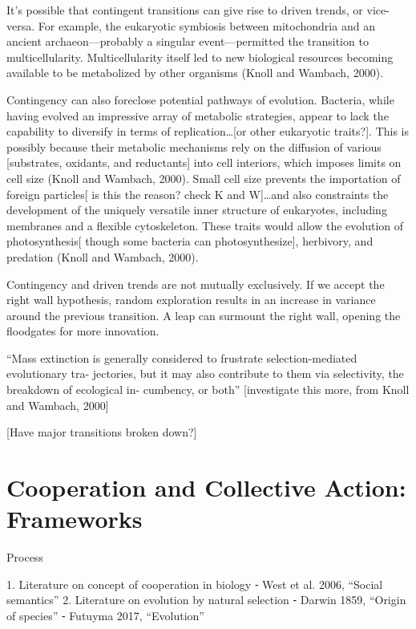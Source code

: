 \documentclass{tufte-book} %
\begin{document}
It’s possible that contingent transitions can give rise to driven trends, or vice-versa. For example, the eukaryotic symbiosis between mitochondria and an ancient archaeon—probably a singular event—permitted the transition to multicellularity. Multicellularity itself led to new biological resources becoming available to be metabolized by other organisms (Knoll and Wambach, 2000). 

Contingency can also foreclose potential pathways of evolution. Bacteria, while having evolved an impressive array of metabolic strategies, appear to lack the capability to diversify in terms of replication…[or other eukaryotic traits?]. This is possibly because their metabolic mechanisms rely on the diffusion of various [substrates, oxidants, and reductants] into cell interiors, which imposes limits on cell size (Knoll and Wambach, 2000). Small cell size prevents the importation of foreign particles[ is this the reason? check K and W]…and also constraints the development of the uniquely versatile inner structure of eukaryotes, including membranes and a flexible cytoskeleton. These traits would allow the evolution of photosynthesis[ though some bacteria can photosynthesize], herbivory, and predation (Knoll and Wambach, 2000). 

Contingency and driven trends are not mutually exclusively. If we accept the right wall hypothesis, random exploration results in an increase in variance around the previous transition. A leap can surmount the right wall, opening the floodgates for more innovation. 

“Mass extinction is generally considered to frustrate selection-mediated evolutionary tra- jectories, but it may also contribute to them via selectivity, the breakdown of ecological in- cumbency, or both” [investigate this more, from Knoll and Wambach, 2000]



[Have major transitions broken down?]



\chapter{Cooperation and Collective Action: Frameworks}\label{frameworks}

Process

	1.	Literature on concept of cooperation in biology
	⁃	West et al. 2006, “Social semantics”
	2.	Literature on evolution by natural selection
	⁃	Darwin 1859, “Origin of species”
	⁃	Futuyma 2017, “Evolution”
\end{document}
